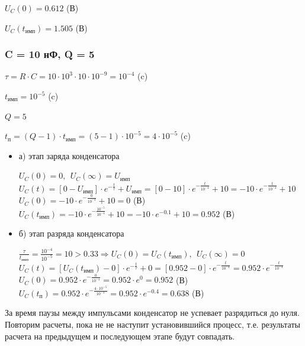 	$U_C(0) = 0.612$ (В)
	
	$U_C(t_\text{имп}) = 1.505$ (В)
	
\subsubsection{C = 10 нФ, Q = 5}

		$\tau = R \cdot C = 10 \cdot 10^3 \cdot 10 \cdot 10^{-9} = 10^{-4}$ (c)
		
		$t_\text{имп} = 10^{-5}$ (c)
		
		$Q = 5$		
		
		$t_\text{п} = (Q - 1) \cdot t_\text{имп} = (5 - 1) \cdot 10^{-5} = 4 \cdot 10^{-5}$ (c)
		
		
\begin{itemize}
\item[] а) этап заряда конденсатора

		$U_C(0) = 0,\ \ U_C(\infty) = U_\text{имп}$\\	
		$U_C(t) = [0 - U_\text{имп}] \cdot e^{-\frac{t}{\tau}} + U_\text{имп} = [0 - 10] \cdot e^{-\frac{t}{10^{-4}}} + 10 = -10 \cdot e^{-\frac{t}{10^{-4}}} + 10$\\
		$U_C(0) = -10 \cdot e^{-\frac{0}{10^{-4}}} + 10 = 0$ (В)\\
		$U_C(t_\text{имп}) = -10 \cdot e^{-\frac{10^{-5}}{10^{-4}}} + 10 = -10 \cdot e^{-0.1} + 10 = 0.952$ (В)\\
		
\item[] б) этап разряда конденсатора
	
		$\frac{\tau}{t_\text{имп}} = \frac{10^{-4}}{10^{-5}} = 10 > 0.33 \Rightarrow U_C(0) = U_C(t_\text{имп}),\ \ U_C(\infty) = 0$\\
		$U_C(t) = [U_C(t_\text{имп}) - 0] \cdot e^{-\frac{t}{\tau}} + 0 =  [0.952 - 0] \cdot e^{-\frac{t}{10^{-4}}} = 0.952 \cdot e^{-\frac{t}{10^{-4}}}$\\
		$U_C(0) = 0.952 \cdot e^{-\frac{0}{10^{-4}}} = 0.952 \cdot e^0 = 0.952$ (В)\\
		$U_C(t_\text{п}) = 0.952 \cdot e^{-\frac{4 \cdot 10^{-5}}{10^{-4}}} = 0.952 \cdot e^{-0.4} = 0.638$ (В)\\
		
\end{itemize}				
		
За время паузы между импульсами конденсатор не успевает разрядиться до нуля. Повторим расчеты, пока не не наступит установившийся процесс, т.е. результаты расчета на предыдущем и последующем этапе будут совпадать.	
	
